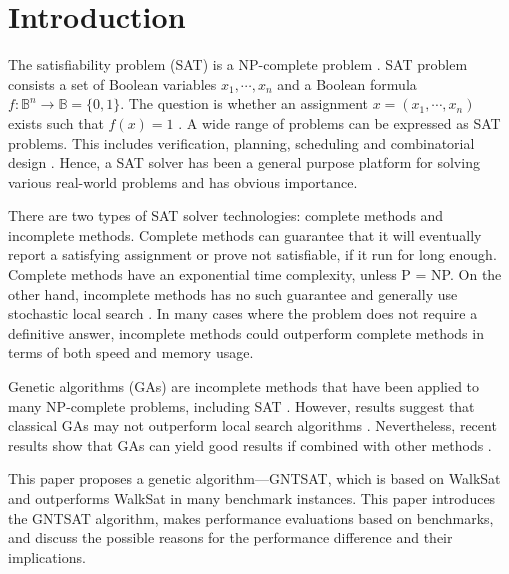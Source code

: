 \section {Introduction}
The satisfiability problem (SAT) is a NP-complete problem
\parencite{cook_1971}. SAT problem consists a set of Boolean variables
$x_1, \cdots, x_n$ and a Boolean formula $f: \mathbb{B}^n \rightarrow \mathbb{B}=\{0, 1\}$. The
question is whether an assignment $x=(x_1, \cdots, x_n)$ exists such that
$f(x)=1$ \parencite{gottlieb_marchiori_rossi_2002}. A wide range of problems can be
expressed as SAT problems. This includes verification, planning, scheduling
and combinatorial design \parencite{biere2009handbook}. Hence, a SAT solver has been a
general purpose platform for solving various real-world problems and has
obvious importance.

There are two types of SAT solver technologies: complete methods and
incomplete methods. Complete methods can guarantee that it will eventually
report a satisfying assignment or prove not satisfiable, if it run for long
enough. Complete methods have an exponential time complexity, unless P = NP.
On the other hand, incomplete methods has no such guarantee and generally use
stochastic local search \parencite{gomes_kautz_sabharwal_selman_2008}. In many cases where the problem
does not require a definitive answer, incomplete methods could outperform
complete methods in terms of both speed and memory usage.

Genetic algorithms (GAs) are incomplete methods that have been applied to many
NP-complete problems, including SAT \parencite{gottlieb_marchiori_rossi_2002}. However, results
suggest that classical GAs may not outperform local search algorithms
\parencite{de1989using}. Nevertheless, recent results show that GAs can yield
good results if combined with other methods \parencite{gottlieb_marchiori_rossi_2002}.

This paper proposes a genetic algorithm---GNTSAT, which is based on WalkSat
\parencite{selman1994noise} and outperforms WalkSat in many benchmark instances.
This paper introduces the GNTSAT algorithm, makes performance evaluations
based on benchmarks, and discuss the possible reasons for the performance
difference and their implications.
